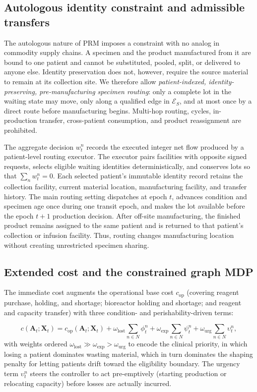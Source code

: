 \documentclass[preprint,review,12pt]{elsarticle}
\begin{document}
\subsection{Autologous identity constraint and admissible transfers}
\label{sec:problem-identity}

The autologous nature of PRM imposes a constraint with no analog in commodity supply chains. A specimen and the product manufactured from it are bound to one patient and cannot be substituted, pooled, split, or delivered to anyone else. Identity preservation does not, however, require the source material to remain at its collection site. We therefore allow \emph{patient-indexed, identity-preserving, pre-manufacturing specimen routing}: only a complete lot in the waiting state may move, only along a qualified edge in $\mathcal{E}_{S}$, and at most once by a direct route before manufacturing begins. Multi-hop routing, cycles, in-production transfer, cross-patient consumption, and product reassignment are prohibited.

The aggregate decision $w_t^n$ records the executed integer net flow produced by a patient-level routing executor. The executor pairs facilities with opposite signed requests, selects eligible waiting identities deterministically, and conserves lots so that $\sum_n w_t^n=0$. Each selected patient's immutable identity record retains the collection facility, current material location, manufacturing facility, and transfer history. The main routing setting dispatches at epoch $t$, advances condition and specimen age once during one transit epoch, and makes the lot available before the epoch $t+1$ production decision. After off-site manufacturing, the finished product remains assigned to the same patient and is returned to that patient's collection or infusion facility. Thus, routing changes manufacturing location without creating unrestricted specimen sharing.

\subsection{Extended cost and the constrained graph MDP}
\label{sec:problem-graph-mdp}

The immediate cost augments the operational base cost $c_{\mathrm{op}}$ (covering reagent purchase, holding, and shortage; bioreactor holding and shortage; and reagent and capacity transfer) with three condition- and perishability-driven terms:

\begin{equation}
\label{eq:cost}
c(\mathbf{A}_t;\mathbf{X}_t) = c_{\mathrm{op}}(\mathbf{A}_t;\mathbf{X}_t)
+ \omega_{\mathrm{lost}}\!\sum_{n\in N}\phi^n_t
+ \omega_{\mathrm{exp}}\!\sum_{n\in N}\psi^n_t
+ \omega_{\mathrm{urg}}\!\sum_{n\in N}\upsilon^n_t,
\end{equation}
with weights ordered $\omega_{\mathrm{lost}} \gg \omega_{\mathrm{exp}} > \omega_{\mathrm{urg}}$ to encode the clinical priority, in which losing a patient dominates wasting material, which in turn dominates the shaping penalty for letting patients drift toward the eligibility boundary. The urgency term $\upsilon^n_t$ steers the controller to act pre-emptively (starting production or relocating capacity) before losses are actually incurred.
\end{document}
